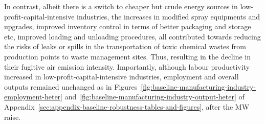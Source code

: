 \documentclass[authoryear, preprint, twocolumn, 1p]{elsarticle}
\begin{document}
    In contrast, albeit there is a switch to cheaper but crude energy sources in low-profit-capital-intensive industries, the increases in modified spray equipments and upgrades, improved inventory control in terms of better packaging and storage etc, improved loading and unloading procedures, all contributed towards reducing the risks of leaks or spills in the transportation of toxic chemical wastes from production points to waste management sites. Thus, resulting in the decline in their fugitive air emission intensity. Importantly, although labour productivity increased in low-profit-capital-intensive industries, employment and overall outputs remained unchanged as in Figures~\ref{fig:baseline-manufacturing-industry-employment-heter} and~\ref{fig:baseline-manufacturing-industry-output-heter} of Appendix~\ref{sec:appendix-baseline-robustness-tables-and-figures}, after the MW raise.
\end{document}
